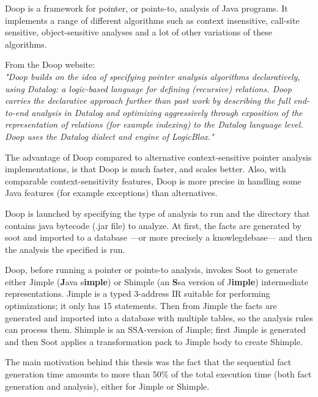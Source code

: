 \documentclass{dithesis}
\begin{document}
    Doop \cite{Doop: Framework for Java Pointer Analysis} is a framework for pointer, or points-to, analysis of Java programs. It implements a range of different algorithms such as context insensitive, call-site sensitive, object-sensitive analyses and a lot of other variations of these algorithms.

	From the Doop website: \\
    \textit{"Doop builds on the idea of specifying pointer analysis algorithms declaratively, using Datalog: a logic-based language for defining (recursive) relations. Doop carries the declarative approach further than past work by describing the full end-to-end analysis in Datalog and optimizing aggressively through exposition of the representation of relations (for example indexing) to the Datalog language level. Doop uses the Datalog dialect and engine of LogicBlox."}

    The advantage of Doop compared to alternative context-sensitive pointer analysis implementations, is that Doop is much faster, and scales better. Also, with comparable context-sensitivity features, Doop is more precise in handling some Java features (for example exceptions) than alternatives.

    Doop is launched by specifying the type of analysis to run and the directory that contains java bytecode (.jar file) to analyze. At first, the facts are generated by soot and imported to a database ---or more precisely a knowlegdebase--- and then the analysis the specified is run. 

        Doop, before running a pointer or points-to analysis, invokes Soot to generate either Jimple (\textbf{J}ava s\textbf{imple}) or Shimple (an \textbf{S}sa version of J\textbf{imple}) intermediate representations. Jimple is a typed 3-address IR suitable for performing optimizations; it only has 15 statements. Then from Jimple the facts are generated and imported into a database with multiple tables, so the analysis rules can process them. Shimple is an SSA-version of Jimple; first Jimple is generated and then Soot applies a transformation pack to Jimple body to create Shimple.

        The main motivation behind this thesis was the fact that the sequential fact generation time amounts to more than 50\% of the total execution time (both fact generation and analysis), either for Jimple or Shimple.
\end{document}
